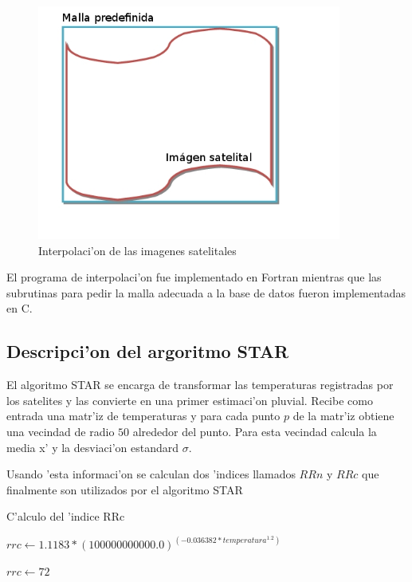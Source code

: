   \begin{figure}[h!]
  \centering
  \includegraphics[width=100mm,bb=0 0 502 388]{./imagenes/malla.jpg}
  \caption{Interpolaci'on de las imagenes satelitales}
  \end{figure}

  El programa de interpolaci'on fue implementado en Fortran mientras que las subrutinas para 
  pedir la malla adecuada a la base de datos fueron implementadas en C.

\subsection{Descripci'on del argoritmo STAR}
  El algoritmo STAR se encarga de transformar las temperaturas registradas por los satelites y las convierte
  en una primer estimaci'on pluvial. Recibe como entrada una matr'iz de temperaturas y para cada punto $p$ de la matr'iz
  obtiene una vecindad de radio $50$ alrededor del punto. Para esta vecindad calcula la media x' y la desviaci'on estandard $\sigma$.

  Usando 'esta informaci'on se calculan dos 'indices llamados $RRn$ y $RRc$ que finalmente son utilizados por el algoritmo STAR

  \begin{algorithm}
  \caption{C'alculo del 'indice RRc}

  \begin{algorithmic}
	  \STATE $rrc \gets 1.1183* (100000000000.0)^(-0.036382*temperatura^{1.2})$
  \ELSE
	  
	  \STATE $rrc \gets 72$ 
	  
  \ENDIF 
  \end{algorithmic}
  \end{algorithm}

